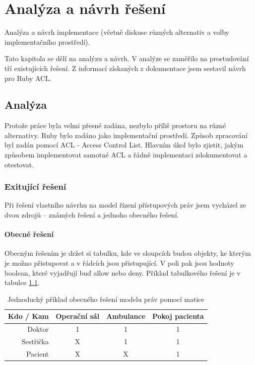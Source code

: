 \chapter{Analýza a návrh řešení}
Analýza a návrh implementace (včetně diskuse různých alternativ a volby implementačního prostředí).

Tato kapitola se dělí na analýzu a návrh. V analýze se zaměřilo na prostudování tří existujících řešení. Z informací získaných z dokumentace jsem sestavil návrh pro Ruby ACL.

\section{Analýza}

Protože práce byla velmi přesně zadána, nezbylo příliš prostoru na různé alternativy. Ruby bylo zadáno jako implementační prostředí. Způsob zpracování byl zadán pomocí ACL - Access Control List. Hlavním úkol bylo zjistit, jakým způsobem implementovat samotné ACL a řádně implementaci zdokumentovat a otestovat.

\subsection{Exitující řešení}
\label{sec:anal-existujicireseni}

Při řešení vlastního návrhu na model řízení přístupových práv jsem vycházel ze dvou zdrojů – známých řešení a jednoho obecného řešení.

\subsubsection{Obecné řešení}
Obecným řešením je držet si tabulku, kde ve sloupcích budou objekty, ke kterým je možno přistupovat a v řádcích jsou přistupující. V poli pak jsou hodnoty boolean, které vyjadřují buď allow nebo deny. Příklad tabulkového řešení je v tabulce \ref{tab:tab2}.
\begin{table}%
\centering
\begin{tabular}{|r||c|c|c|}
\hline
Kdo / Kam & Operační sál & Ambulance & Pokoj pacienta\\
\hline\hline
Doktor & 1 & 1 & 1\\
\hline
Sestřička & X & 1 & 1\\
\hline
Pacient & X & X & 1\\
\hline
\end{tabular}
\caption{Jednoduchý příklad obecného řešení modelu práv pomocí matice}
\label{tab:tab2}
\end{table}

